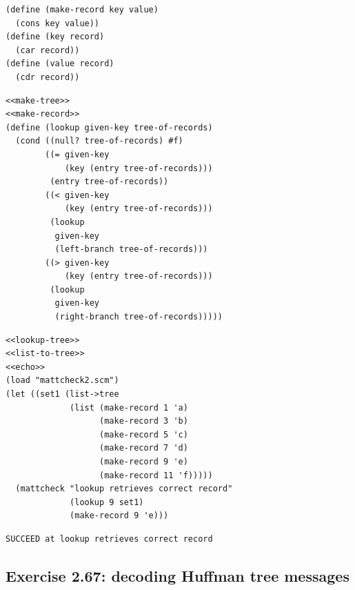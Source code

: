 \documentclass[final,fleqn,titlepage,twoside]{article}
\begin{document}
\begin{verbatim}
(define (make-record key value)
  (cons key value))
(define (key record)
  (car record))
(define (value record)
  (cdr record))
\end{verbatim}

\begin{verbatim}
<<make-tree>>
<<make-record>>
(define (lookup given-key tree-of-records)
  (cond ((null? tree-of-records) #f)
        ((= given-key
            (key (entry tree-of-records)))
         (entry tree-of-records))
        ((< given-key
            (key (entry tree-of-records)))
         (lookup
          given-key 
          (left-branch tree-of-records)))
        ((> given-key
            (key (entry tree-of-records)))
         (lookup
          given-key 
          (right-branch tree-of-records)))))
\end{verbatim}

\begin{verbatim}
<<lookup-tree>>
<<list-to-tree>>
<<echo>>
(load "mattcheck2.scm")
(let ((set1 (list->tree
             (list (make-record 1 'a)
                   (make-record 3 'b)
                   (make-record 5 'c)
                   (make-record 7 'd)
                   (make-record 9 'e)
                   (make-record 11 'f)))))
  (mattcheck "lookup retrieves correct record"
             (lookup 9 set1)
             (make-record 9 'e)))
\end{verbatim}

\begin{verbatim}
SUCCEED at lookup retrieves correct record
\end{verbatim}

\subsection{Exercise 2.67: decoding Huffman tree messages}
\label{sec:org2803cb8}
\end{document}
